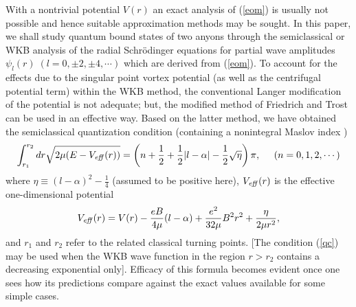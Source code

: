 \documentclass[a4paper,aps,eqsecnum,preprint,preprintnumbers,12pt]{revtex4}
\begin{document}
With a nontrivial potential $V(r)$ an exact analysis of
(\ref{eom}) is usually not possible and hence suitable
approximation methods may be sought. In this paper, we shall study
quantum bound states of two anyons through the semiclassical or
WKB analysis of the radial Schr\"{o}dinger equations for partial
wave amplitudes $\psi_{l}(r) \; (l=0, \pm 2, \pm 4, \cdots)$ which
are derived from (\ref{eom}). To account for the effects due to
the singular point vortex potential (as well as the centrifugal
potential term) within the WKB method, the conventional Langer
modification \cite{langer} of the potential is not adequate; but,
the modified method of Friedrich and Trost \cite{friedrich} can be
used in an effective way. Based on the latter method, we have
obtained the semiclassical quantization condition (containing a
nonintegral Maslov index \cite{gutzwiller})
\begin{equation} \label{qc}
\int_{r_{1}}^{r_{2}} dr \sqrt{ 2\mu ( E - V_{\it eff}(r) ) } =
\left( n + \frac{1}{2} + \frac{1}{2} |l-\alpha| - \frac{1}{2}
\sqrt{\eta} \right) \pi, \;\;\;\;\; ( n = 0, 1, 2, \cdots )
\end{equation}
where $\eta \equiv (l-\alpha)^{2} - \displaystyle \frac{1}{4}$
(assumed to be positive here), $V_{\it eff}(r)$ is the effective
one-dimensional potential
\begin{equation} \label{effv}
V_{\it eff}(r) = V(r) - \frac{eB}{4\mu} (l-\alpha) +
\frac{e^{2}}{32\mu} B^{2} r^{2} + \frac{\eta}{2\mu r^{2}},
\end{equation}
and $r_{1}$ and $r_{2}$ refer to the related classical turning
points. [The condition (\ref{qc}) may be used when the WKB wave
function in the region $r>r_{2}$ contains a decreasing exponential
only]. Efficacy of this formula becomes evident once one sees how
its predictions compare against the exact values available for
some simple cases.
\end{document}

